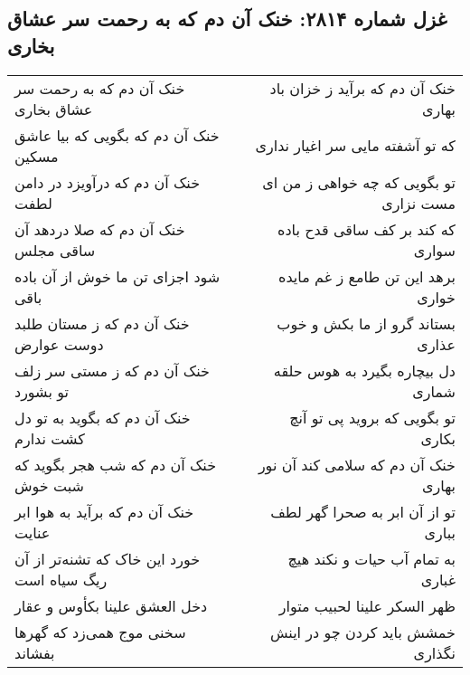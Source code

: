 \begin{center}
\section*{غزل شماره ۲۸۱۴: خنک آن دم که به رحمت سر عشاق بخاری}
\label{sec:2814}
\begin{longtable}{l p{0.5cm} r}
خنک آن دم که به رحمت سر عشاق بخاری
&&
خنک آن دم که برآید ز خزان باد بهاری
\\
خنک آن دم که بگویی که بیا عاشق مسکین
&&
که تو آشفته مایی سر اغیار نداری
\\
خنک آن دم که درآویزد در دامن لطفت
&&
تو بگویی که چه خواهی ز من ای مست نزاری
\\
خنک آن دم که صلا دردهد آن ساقی مجلس
&&
که کند بر کف ساقی قدح باده سواری
\\
شود اجزای تن ما خوش از آن باده باقی
&&
برهد این تن طامع ز غم مایده خواری
\\
خنک آن دم که ز مستان طلبد دوست عوارض
&&
بستاند گرو از ما بکش و خوب عذاری
\\
خنک آن دم که ز مستی سر زلف تو بشورد
&&
دل بیچاره بگیرد به هوس حلقه شماری
\\
خنک آن دم که بگوید به تو دل کشت ندارم
&&
تو بگویی که بروید پی تو آنچ بکاری
\\
خنک آن دم که شب هجر بگوید که شبت خوش
&&
خنک آن دم که سلامی کند آن نور بهاری
\\
خنک آن دم که برآید به هوا ابر عنایت
&&
تو از آن ابر به صحرا گهر لطف بباری
\\
خورد این خاک که تشنه‌تر از آن ریگ سیاه است
&&
به تمام آب حیات و نکند هیچ غباری
\\
دخل العشق علینا بکأوس و عقار
&&
ظهر السکر علینا لحبیب متوار
\\
سخنی موج همی‌زد که گهرها بفشاند
&&
خمشش باید کردن چو در اینش نگذاری
\\
\end{longtable}
\end{center}
